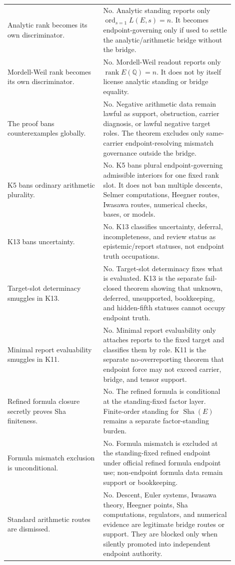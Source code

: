 \documentclass[11pt]{article}
\newcommand{\Q}{\mathbb{Q}}
\newcommand{\Sha}{\operatorname{Sha}}
\newcommand{\rank}{\operatorname{rank}}
\newcommand{\ord}{\operatorname{ord}}
\begin{document}
\begin{longtable}{L{0.38\linewidth}L{0.52\linewidth}}
Analytic rank becomes its own discriminator. & No. Analytic standing reports only $\ord_{s=1}L(E,s)=n$. It becomes endpoint-governing only if used to settle the analytic/arithmetic bridge without the bridge.\\
Mordell-Weil rank becomes its own discriminator. & No. Mordell-Weil readout reports only $\rank E(\Q)=n$. It does not by itself license analytic standing or bridge equality.\\
The proof bans counterexamples globally. & No. Negative arithmetic data remain lawful as support, obstruction, carrier diagnosis, or lawful negative target roles. The theorem excludes only same-carrier endpoint-resolving mismatch governance outside the bridge.\\
K5 bans ordinary arithmetic plurality. & No. K5 bans plural endpoint-governing admissible interiors for one fixed rank slot. It does not ban multiple descents, Selmer computations, Heegner routes, Iwasawa routes, numerical checks, bases, or models.\\
K13 bans uncertainty. & No. K13 classifies uncertainty, deferral, incompleteness, and review status as epistemic/report statuses, not endpoint truth occupations.\\
Target-slot determinacy smuggles in K13. & No. Target-slot determinacy fixes what is evaluated. K13 is the separate fail-closed theorem showing that unknown, deferred, unsupported, bookkeeping, and hidden-fifth statuses cannot occupy endpoint truth.\\
Minimal report evaluability smuggles in K11. & No. Minimal report evaluability only attaches reports to the fixed target and classifies them by role. K11 is the separate no-overreporting theorem that endpoint force may not exceed carrier, bridge, and tensor support.\\
Refined formula closure secretly proves Sha finiteness. & No. The refined formula is conditional at the standing-fixed factor layer. Finite-order standing for $\Sha(E)$ remains a separate factor-standing burden.\\
Formula mismatch exclusion is unconditional. & No. Formula mismatch is excluded at the standing-fixed refined endpoint under official refined formula endpoint use; non-endpoint formula data remain support or bookkeeping.\\
Standard arithmetic routes are dismissed. & No. Descent, Euler systems, Iwasawa theory, Heegner points, Sha computations, regulators, and numerical evidence are legitimate bridge routes or support. They are blocked only when silently promoted into independent endpoint authority.\\
\bottomrule
\end{longtable}
\end{document}
